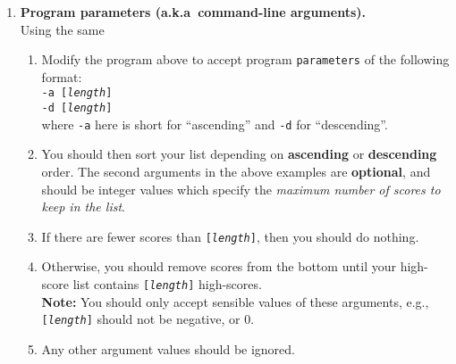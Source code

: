 \documentclass[11pt]{report}
\begin{document}
\begin{enumerate}
	\item {\bf Program parameters (a.k.a\ command-line arguments).}\\
	Using the same
	\begin{enumerate}
		\item Modify the program above to accept program {\tt parameters} of the following format:\\
		{\tt -a [\emph{length}]}\\
		{\tt -d [\emph{length}]}\\
		where {\tt -a} here is short for ``ascending'' and {\tt -d} for ``descending''.
		\item You should then sort your list depending on \textbf{ascending} or \textbf{descending} order. The second arguments in the above examples are \textbf{optional}, and should be integer values which specify the \emph{maximum number of scores to keep in the list}.
		\item If there are fewer scores than {\tt [\emph{length}]}, then you should do nothing.
		\item Otherwise, you should remove scores from the bottom until your high-score list contains {\tt [\emph{length}]} high-scores.\\
		\textbf{Note:} You should only accept sensible values of these arguments, e.g., {\tt [\emph{length}]} should not be negative, or 0.
		\item Any other argument values should be ignored.
	\end{enumerate}
\end{enumerate}
\end{document}
